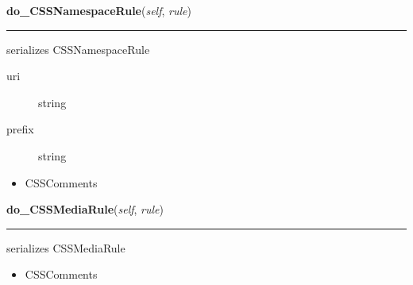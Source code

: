    \label{cssutils:serialize:CSSSerializer:do_CSSNamespaceRule}

    \vspace{0.5ex}

\hspace{.8\funcindent}\begin{boxedminipage}{\funcwidth}

    \raggedright \textbf{do\_CSSNamespaceRule}(\textit{self}, \textit{rule})

    \vspace{-1.5ex}

    \rule{\textwidth}{0.5\fboxrule}
\setlength{\parskip}{2ex}

serializes CSSNamespaceRule
\begin{description}
\item[{uri}] \leavevmode 
string

\item[{prefix}] \leavevmode 
string

\end{description}
\begin{itemize}
\item {} 
CSSComments

\end{itemize}
\setlength{\parskip}{1ex}
    \end{boxedminipage}

    \label{cssutils:serialize:CSSSerializer:do_CSSMediaRule}

    \vspace{0.5ex}

\hspace{.8\funcindent}\begin{boxedminipage}{\funcwidth}

    \raggedright \textbf{do\_CSSMediaRule}(\textit{self}, \textit{rule})

    \vspace{-1.5ex}

    \rule{\textwidth}{0.5\fboxrule}
\setlength{\parskip}{2ex}

serializes CSSMediaRule
\begin{itemize}
\item {} 
CSSComments

\end{itemize}
\setlength{\parskip}{1ex}
    \end{boxedminipage}


